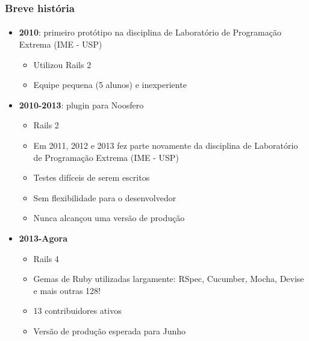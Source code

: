 \documentclass{beamer}
\begin{document}
\begin{frame}
  \frametitle{Breve história}
  \framesubtitle{}

  \begin{itemize}
    \item \textbf{2010}: primeiro protótipo na disciplina de Laboratório de Programação Extrema (IME - USP)
      \begin{itemize}
        \item Utilizou Rails 2
        \item Equipe pequena (5 alunos) e inexperiente
      \end{itemize}
    \item \textbf{2010-2013}: plugin para Noosfero
      \begin{itemize}
        \item Rails 2
        \item Em 2011, 2012 e 2013 fez parte novamente da disciplina de Laboratório de Programação Extrema (IME - USP)
        \item Testes difíceis de serem escritos
        \item Sem flexibilidade para o desenvolvedor
        \item Nunca alcançou uma versão de produção
      \end{itemize}
    \item \textbf{2013-Agora}
      \begin{itemize}
        \item Rails 4
        \item Gemas de Ruby utilizadas largamente: RSpec, Cucumber, Mocha, Devise e mais outras 128!
        \item 13 contribuidores ativos
        \item Versão de produção esperada para Junho
      \end{itemize}
  \end{itemize}
\end{frame}
\end{document}
